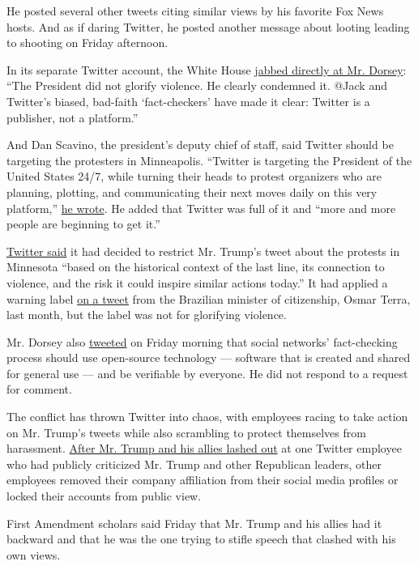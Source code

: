 He posted several other tweets citing similar views by his favorite Fox
News hosts. And as if daring Twitter, he posted another message about
looting leading to shooting on Friday afternoon.

In its separate Twitter account, the White House
\href{https://twitter.com/WhiteHouse/status/1266373803870806023}{jabbed
directly at Mr. Dorsey}: ``The President did not glorify violence. He
clearly condemned it. @Jack and Twitter's biased, bad-faith
`fact-checkers' have made it clear: Twitter is a publisher, not a
platform.''

And Dan Scavino, the president's deputy chief of staff, said Twitter
should be targeting the protesters in Minneapolis. ``Twitter is
targeting the President of the United States 24/7, while turning their
heads to protest organizers who are planning, plotting, and
communicating their next moves daily on this very platform,''
\href{https://twitter.com/Scavino45/status/1266343153466060803}{he
wrote}. He added that Twitter was full of it and ``more and more people
are beginning to get it.''

\href{https://twitter.com/TwitterComms/status/1266267446979129345}{Twitter
said} it had decided to restrict Mr. Trump's tweet about the protests in
Minnesota ``based on the historical context of the last line, its
connection to violence, and the risk it could inspire similar actions
today.'' It had applied a warning label
\href{https://twitter.com/OsmarTerra/status/1246474430676643842}{on a
tweet} from the Brazilian minister of citizenship, Osmar Terra, last
month, but the label was not for glorifying violence.

Mr. Dorsey also
\href{https://twitter.com/jack/status/1266390510278569984}{tweeted} on
Friday morning that social networks' fact-checking process should use
open-source technology --- software that is created and shared for
general use --- and be verifiable by everyone. He did not respond to a
request for comment.

The conflict has thrown Twitter into chaos, with employees racing to
take action on Mr. Trump's tweets while also scrambling to protect
themselves from harassment.
\href{https://www.nytimes3xbfgragh.onion/2020/05/27/technology/trump-twitter.html}{After
Mr. Trump and his allies lashed out} at one Twitter employee who had
publicly criticized Mr. Trump and other Republican leaders, other
employees removed their company affiliation from their social media
profiles or locked their accounts from public view.

First Amendment scholars said Friday that Mr. Trump and his allies had
it backward and that he was the one trying to stifle speech that clashed
with his own views.

